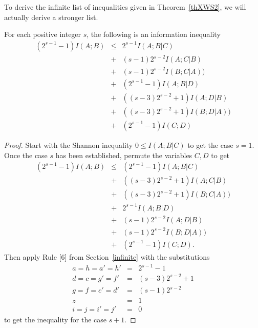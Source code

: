 \documentclass[10pt,journal]{IEEEtran}
\begin{document}
To derive the infinite list of inequalities given in Theorem~\ref{thXWS2}, we will actually
derive a stronger list.
\begin{theorem}\label{thXWS3}
For each positive integer $s$, the following is an information inequality
\begin{eqnarray*}
(2^{s-1}-1)I(A;B) &\leq& 2^{s-1}I(A;B|C)\\
      &+& (s-1)2^{s-2}I(A;C|B)\\
      &+& (s-1)2^{s-2}I(B;C|A)) \\
      &+&  (2^{s-1}-1)I(A;B|D) \\
      &+& ((s-3)2^{s-2}+1)I(A;D|B)\\
      &+& ((s-3)2^{s-2}+1)I(B;D|A))\\
      &+& (2^{s-1}-1)I(C;D)
\end{eqnarray*}
\end{theorem}
\begin{proof}
Start with the Shannon inequality $0\leq I(A;B|C)$ to get the case $s=1$.
Once the case $s$ has been established, permute the variables $C,D$ to get
\begin{eqnarray*}
(2^{s-1}-1)I(A;B) &\leq& (2^{s-1}-1)I(A;B|C)\\
      &+& ((s-3)2^{s-2}+1)I(A;C|B)\\
      &+& ((s-3)2^{s-2}+1)I(B;C|A)) \\
      &+&  2^{s-1}I(A;B|D) \\
      &+& (s-1)2^{s-2}I(A;D|B)\\
      &+& (s-1)2^{s-2}I(B;D|A))\\
      &+& (2^{s-1}-1)I(C;D).
\end{eqnarray*}
Then apply Rule [6] from Section~\ref{infinite}  with the substitutions
\begin{eqnarray*}
a=h=a'=h' &=& 2^{s-1}-1\\
d=c=g'=f' &=& (s-3)2^{s-2}+1\\
g=f=c'=d' &=& (s-1)2^{s-2}\\
z&=&1\\
i=j=i'=j'&=& 0
\end{eqnarray*}
to get the inequality for the case $s+1$.
\end{proof}
\end{document}
